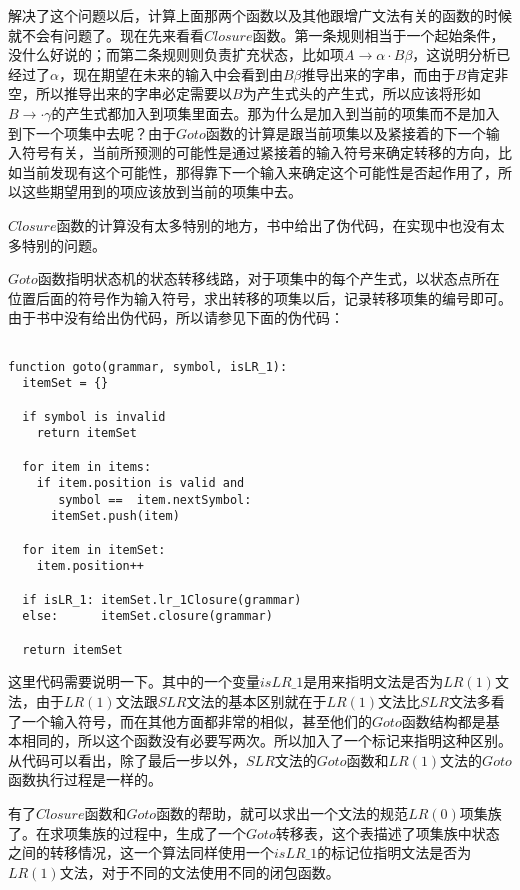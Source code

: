 解决了这个问题以后，计算上面那两个函数以及其他跟增广文法有关的函数的时候就不会有问题了。现在先来看看$Closure$函数。第一条规则相当于一个起始条件，没什么好说的；而第二条规则则负责扩充状态，比如项$A \rightarrow \alpha \cdot B \beta$，这说明分析已经过了$\alpha$，现在期望在未来的输入中会看到由$B \beta$推导出来的字串，而由于$B$肯定非空，所以推导出来的字串必定需要以$B$为产生式头的产生式，所以应该将形如$B \rightarrow \cdot \gamma$的产生式都加入到项集里面去。那为什么是加入到当前的项集而不是加入到下一个项集中去呢？由于$Goto$函数的计算是跟当前项集以及紧接着的下一个输入符号有关，当前所预测的可能性是通过紧接着的输入符号来确定转移的方向，比如当前发现有这个可能性，那得靠下一个输入来确定这个可能性是否起作用了，所以这些期望用到的项应该放到当前的项集中去。

$Closure$函数的计算没有太多特别的地方，书中给出了伪代码，在实现中也没有太多特别的问题。

$Goto$函数指明状态机的状态转移线路，对于项集中的每个产生式，以状态点所在位置后面的符号作为输入符号，求出转移的项集以后，记录转移项集的编号即可。由于书中没有给出伪代码，所以请参见下面的伪代码：

\begin{verbatim}

function goto(grammar, symbol, isLR_1):
  itemSet = {}

  if symbol is invalid
    return itemSet

  for item in items:
    if item.position is valid and
       symbol ==  item.nextSymbol:
      itemSet.push(item)

  for item in itemSet:
    item.position++

  if isLR_1: itemSet.lr_1Closure(grammar)
  else:      itemSet.closure(grammar)

  return itemSet

\end{verbatim}

这里代码需要说明一下。其中的一个变量$isLR\_1$是用来指明文法是否为$LR(1)$文法，由于$LR(1)$文法跟$SLR$文法的基本区别就在于$LR(1)$文法比$SLR$文法多看了一个输入符号，而在其他方面都非常的相似，甚至他们的$Goto$函数结构都是基本相同的，所以这个函数没有必要写两次。所以加入了一个标记来指明这种区别。从代码可以看出，除了最后一步以外，$SLR$文法的$Goto$函数和$LR(1)$文法的$Goto$函数执行过程是一样的。

有了$Closure$函数和$Goto$函数的帮助，就可以求出一个文法的规范$LR(0)$项集族了。在求项集族的过程中，生成了一个$Goto$转移表，这个表描述了项集族中状态之间的转移情况，这一个算法同样使用一个$isLR\_1$的标记位指明文法是否为$LR(1)$文法，对于不同的文法使用不同的闭包函数。

